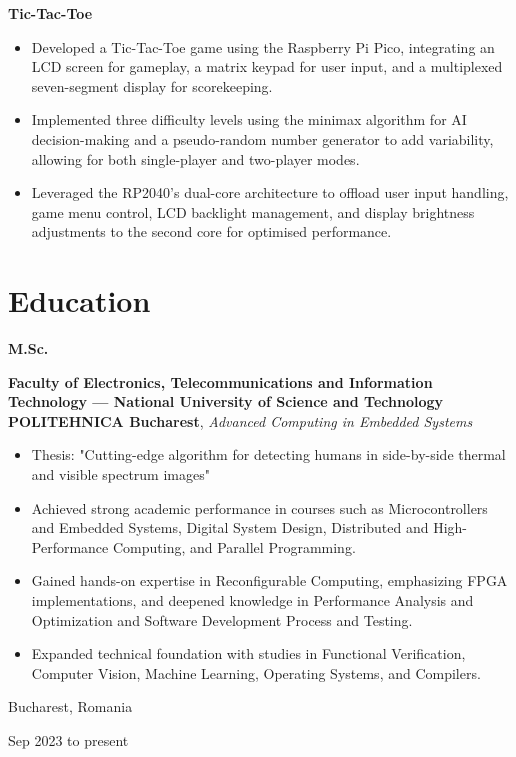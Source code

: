 \documentclass[10pt, a4paper]{article}
\newenvironment{highlights}{
    \begin{itemize}[
        topsep=0.1 cm,
        parsep=0.1 cm,
        partopsep=0pt,
        itemsep=0pt,
        leftmargin=0 cm + 10pt
    ]
}{
    \end{itemize}
} %
\newenvironment{twocolentry}[2][]{
    \onecolentry
    \def\secondColumn{#2}
    \setcolumnwidth{\fill, 3.5 cm}
    \begin{paracol}{2}
}{
    \switchcolumn \raggedleft \secondColumn
    \end{paracol}
    \endonecolentry
} %
\newenvironment{threecolentry}[3][]{
    \onecolentry
    \def\thirdColumn{#3}
    \setcolumnwidth{1 cm, \fill, 3.5 cm}
    \begin{paracol}{3}
    {\raggedright #2} \switchcolumn
}{
    \switchcolumn \raggedleft \thirdColumn
    \end{paracol}
    \endonecolentry
} %
\let\hrefWithoutArrow\href
\renewcommand{\href}[2]{\hrefWithoutArrow{#1}{\ifthenelse{\equal{#2}{}}{ }{#2 }\raisebox{.15ex}{\footnotesize \faExternalLink*}}}
\begin{document}
        \begin{twocolentry}{
            \href{https://github.com/cristiancristea00/tic-tac-toe}{GitHub}
        }
            \textbf{Tic-Tac-Toe}
            \begin{highlights}
                \item Developed a Tic-Tac-Toe game using the Raspberry Pi Pico, integrating an LCD screen for gameplay, a matrix keypad for user input, and a multiplexed seven-segment display for scorekeeping.
                \item Implemented three difficulty levels using the minimax algorithm for AI decision-making and a pseudo-random number generator to add variability, allowing for both single-player and two-player modes.
                \item Leveraged the RP2040’s dual-core architecture to offload user input handling, game menu control, LCD backlight management, and display brightness adjustments to the second core for optimised performance.
            \end{highlights}
        \end{twocolentry}



    
    \section{Education}



        
        \begin{threecolentry}{\textbf{M.Sc.}}{
            Bucharest, Romania

        Sep 2023 to present
        }
            \textbf{Faculty of Electronics, Telecommunications and Information Technology — National University of Science and Technology POLITEHNICA Bucharest}, \textit{Advanced Computing in Embedded Systems}
            \begin{highlights}
                \item Thesis: "Cutting-edge algorithm for detecting humans in side-by-side thermal and visible spectrum images"
                \item Achieved strong academic performance in courses such as Microcontrollers and Embedded Systems, Digital System Design, Distributed and High-Performance Computing, and Parallel Programming.
                \item Gained hands-on expertise in Reconfigurable Computing, emphasizing FPGA implementations, and deepened knowledge in Performance Analysis and Optimization and Software Development Process and Testing.
                \item Expanded technical foundation with studies in Functional Verification, Computer Vision, Machine Learning, Operating Systems, and Compilers.
            \end{highlights}
        \end{threecolentry}
\end{document}
